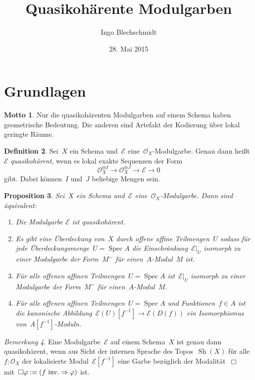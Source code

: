 \documentclass[a4paper,ngerman,12pt]{scrartcl}
\theoremstyle{definition}
\newtheorem{defn}{Definition}[section]
\newtheorem{motto}[defn]{Motto}
\theoremstyle{plain}
\newtheorem{prop}[defn]{Proposition}
\theoremstyle{remark}
\newtheorem{rem}[defn]{Bemerkung}
\newcommand{\E}{\mathcal{E}}
\renewcommand{\O}{\mathcal{O}}
\newcommand{\lra}{\longrightarrow}
\newcommand{\Sh}{\operatorname{Sh}}
\DeclareMathOperator{\Spec}{Spec}
\newcommand{\defeqv}{\vcentcolon\equiv}
\begin{document}
\title{Quasikohärente Modulgarben}
\author{Ingo Blechschmidt}
\date{28. Mai 2015}
\maketitle

\section{Grundlagen}

\begin{motto}Nur die quasikohärenten Modulgarben auf einem Schema haben
geometrische Bedeutung. Die anderen sind Artefakt der Kodierung über lokal
geringte Räume.\end{motto}

\begin{defn}Sei~$X$ ein Schema und~$\E$ eine~$\O_X$-Modulgarbe. Genau dann
heißt~$\E$ \emph{quasikohärent}, wenn es lokal exakte Sequenzen der Form
\[ \O_X^{\oplus I} \lra \O_X^{\oplus J} \lra \E \lra 0 \]
gibt. Dabei können~$I$ und~$J$ beliebige Mengen sein.
\end{defn}

\begin{prop}Sei~$X$ ein Schema und~$\E$ eine~$\O_X$-Modulgarbe. Dann sind
äquivalent:
\begin{enumerate}
\item Die Modulgarbe $\E$ ist quasikohärent.
\item Es gibt eine Überdeckung von~$X$ durch offene affine Teilmengen~$U$ sodass
für jede Überdeckungsmenge~$U = \Spec A$ die Einschränkung~$\E|_U$ isomorph zu
einer Modulgarbe der Form~$M^\sim$ für einen~$A$-Modul~$M$ ist.
\item Für alle offenen affinen Teilmengen~$U = \Spec A$ ist~$\E|_U$ isomorph zu einer
Modulgarbe der Form~$M^\sim$ für einen~$A$-Modul~$M$.
\item Für alle offenen affinen Teilmengen~$U = \Spec A$ und Funktionen~$f \in
A$ ist die kanonische Abbildung~$\E(U)[f^{-1}] \to \E(D(f))$ ein Isomorphismus
von~$A[f^{-1}]$-Moduln.
\end{enumerate}
\end{prop}

\begin{rem}Eine Modulgarbe~$\E$ auf einem Schema~$X$ ist genau dann
quasikohärent, wenn aus Sicht der internen Sprache des Topos~$\Sh(X)$ für
alle~$f : \O_X$ der lokalisierte Modul~$\E[f^{-1}]$ eine Garbe bezüglich der
Modalität~$\Box$ mit~$\Box\varphi \defeqv (\text{$f$ inv.} \Rightarrow
\varphi)$ ist.\end{rem}
\end{document}
